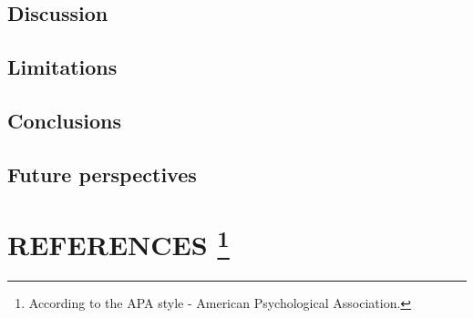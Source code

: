 \documentclass[
  12pt,
  a4paper,
  oneside]{tesesusp}
\begin{document}
\vspace{10pt}

\hypertarget{discussion-1}{%
\section{Discussion}\label{discussion-1}}

\hypertarget{limitations}{%
\section{Limitations}\label{limitations}}

\hypertarget{conclusions}{%
\section{Conclusions}\label{conclusions}}

\hypertarget{future-perspectives}{%
\section{Future perspectives}\label{future-perspectives}}


\hypertarget{references-1}{%
\chapter*{\texorpdfstring{REFERENCES
\footnote{According to the APA style - American Psychological
  Association.}}{REFERENCES }}\label{references-1}}


\postextual
\end{document}
